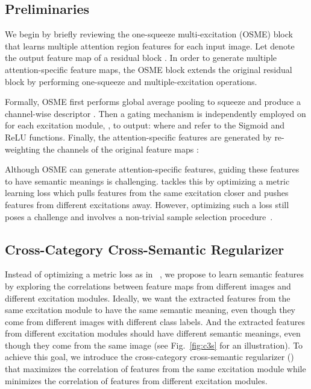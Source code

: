 \documentclass[10pt,twocolumn,letterpaper]{article}
\begin{document}
\subsection{Preliminaries}
\label{sec:pre}
We begin by briefly reviewing the one-squeeze multi-excitation (OSME) block~\cite{mamc18eccv} that learns multiple attention region features for each input image.
Let  denote the output feature map of a residual block . 
In order to generate multiple attention-specific feature maps, the OSME block extends the original residual block by performing one-squeeze and multiple-excitation operations.

Formally, OSME first performs global average pooling to squeeze  and produce a channel-wise descriptor .
Then a gating mechanism is independently employed on  for each excitation module, , to output: 
where  and  refer to the Sigmoid and ReLU functions. Finally, the attention-specific features  are generated by re-weighting the channels of the original feature maps :


Although OSME can generate attention-specific features, guiding these features to have semantic meanings is challenging. 
{\cite{mamc18eccv}} tackles this by optimizing a metric learning loss which pulls features from the same excitation closer and pushes features from different excitations away. However, optimizing such a loss still poses a challenge and involves a non-trivial sample selection procedure~\cite{wu2017sampling}.


\subsection{Cross-Category Cross-Semantic Regularizer}
\label{sec:fsc}
Instead of optimizing a metric loss as in ~\cite{mamc18eccv}, we propose to learn semantic features by exploring the correlations between feature maps from different images and different excitation modules.
Ideally, we want the extracted features from the same excitation module to have the same semantic meaning, even though they come from different images with different class labels. And the extracted features from different excitation modules should have different semantic meanings, even though they come from the same image (see Fig.~\ref{fig:c3s} for an illustration).
To achieve this goal, we introduce the cross-category cross-semantic regularizer () that maximizes the correlation of features from the same excitation module while minimizes the correlation of features from different excitation modules.
\end{document}
